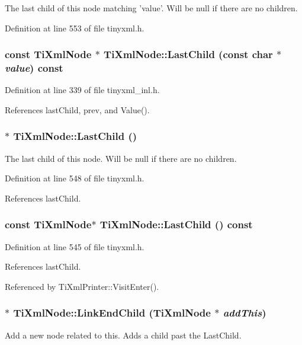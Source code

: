 The last child of this node matching 'value'. Will be null if there are no children. 

Definition at line 553 of file tinyxml.h.\hypertarget{class_ti_xml_node_acdd3fdc436aa7433023310a041e5e63f}{
\subsubsection[{LastChild}]{\setlength{\rightskip}{0pt plus 5cm}const {\bf TiXmlNode} $\ast$ TiXmlNode::LastChild (const char $\ast$ {\em value}) const}}
\label{class_ti_xml_node_acdd3fdc436aa7433023310a041e5e63f}


Definition at line 339 of file tinyxml\_\-inl.h.

References lastChild, prev, and Value().\hypertarget{class_ti_xml_node_a6432d2b2495f6caf9cb4278df706a031}{
\subsubsection[{LastChild}]{$\ast$ TiXmlNode::LastChild ()}}
\label{class_ti_xml_node_a6432d2b2495f6caf9cb4278df706a031}


The last child of this node. Will be null if there are no children. 

Definition at line 548 of file tinyxml.h.

References lastChild.\hypertarget{class_ti_xml_node_a6d671107e00cca1d28cb2d7f3a87a21e}{
\subsubsection[{LastChild}]{\setlength{\rightskip}{0pt plus 5cm}const {\bf TiXmlNode}$\ast$ TiXmlNode::LastChild () const}}
\label{class_ti_xml_node_a6d671107e00cca1d28cb2d7f3a87a21e}


Definition at line 545 of file tinyxml.h.

References lastChild.

Referenced by TiXmlPrinter::VisitEnter().\hypertarget{class_ti_xml_node_a1a881212554b759865f6cac79a851d38}{
\subsubsection[{LinkEndChild}]{ $\ast$ TiXmlNode::LinkEndChild ({\bf TiXmlNode} $\ast$ {\em addThis})}}
\label{class_ti_xml_node_a1a881212554b759865f6cac79a851d38}
Add a new node related to this. Adds a child past the LastChild.

